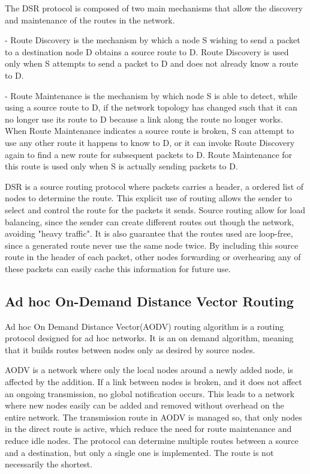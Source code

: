 The DSR protocol is composed of two main mechanisms that allow the discovery and maintenance of the routes in the network.

- Route Discovery is the mechanism by which a node S wishing to send a packet to a destination node D obtains a source route to D.
Route Discovery is used only when S attempts to send a packet to D and does not already know a route to D.

- Route Maintenance is the mechanism by which node S is able to detect, while using a source route to D, if the network topology has changed such that it can no longer use its route to D 
because a link along the route no longer works.
When Route Maintenance indicates a source route is broken, S can attempt to use any other route it happens to know to D, or it can invoke Route Discovery again to find a new route for subsequent packets to D.
Route Maintenance for this route is used only when S is actually sending packets to D.

DSR is a source routing protocol where packets carries a header, a ordered list of nodes to determine the route.
This explicit use of routing allows the sender to select and control the route for the packets it sends.
Source routing allow for load balancing, since the sender can create different routes out though the network, avoiding "heavy traffic".
It is also guarantee that the routes used are loop-free, since a generated route never use the same node twice.
By including this source route in the header of each packet, other nodes forwarding or overhearing any of these packets can easily cache this information for future use\cite{DSR}.

\subsection{Ad hoc On-Demand Distance Vector Routing}
Ad hoc On Demand Distance Vector(AODV) routing algorithm is a routing protocol designed for ad hoc networks. 
It is an on demand algorithm, meaning that it builds routes between nodes only as desired by source nodes\cite{AOVD1}.

AODV is a network where only the local nodes around a newly added node, is affected by the addition.
If a link between nodes is broken, and it does not affect an ongoing transmission, no global notification occurs.
This leads to a network where new nodes easily can be added and removed without overhead on the entire network.
The transmission  route in AODV is managed so, that only nodes in the direct route is active, which reduce the need for route maintenance and reduce idle nodes.
The protocol can determine multiple routes between a source and a destination, but only a single one is implemented.
The route is not necessarily the shortest\cite{AOVD1}.

